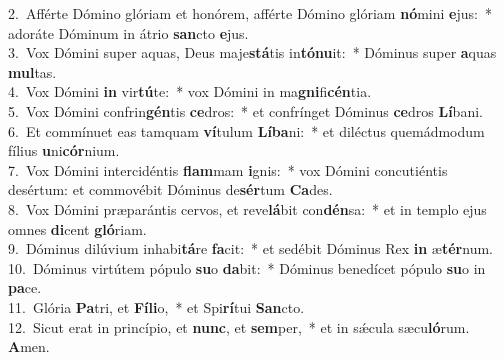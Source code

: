 {2.~}Afférte Dómino glóriam et honórem, afférte Dómino glóriam \textbf{nó}mini \textbf{e}jus:~* adoráte Dóminum in átrio \textbf{san}cto \textbf{e}jus.\\
{3.~}Vox Dómini super aquas, Deus maje\textbf{stá}tis in\textbf{tó}\textbf{nu}it:~* Dóminus super \textbf{a}quas \textbf{mul}tas.\\
{4.~}Vox Dómini \textbf{in} vir\textbf{tú}te:~* vox Dómini in ma\textbf{gni}fi\textbf{cén}tia.\\
{5.~}Vox Dómini confrin\textbf{gén}tis \textbf{ce}dros:~* et confrínget Dóminus \textbf{ce}dros \textbf{Lí}bani.\\
{6.~}Et commínuet eas tamquam \textbf{ví}tulum \textbf{Lí}\textbf{ba}ni:~* et diléctus quemádmodum fílius \textbf{u}ni\textbf{cór}nium.\\
{7.~}Vox Dómini intercidéntis \textbf{flam}mam \textbf{i}gnis:~* vox Dómini concutiéntis desértum: et commovébit Dóminus de\textbf{sér}tum \textbf{Ca}des.\\
{8.~}Vox Dómini præparántis cervos, et reve\textbf{lá}bit con\textbf{dén}sa:~* et in templo ejus omnes \textbf{di}cent \textbf{gló}riam.\\
{9.~}Dóminus dilúvium inhabi\textbf{tá}re \textbf{fa}cit:~* et sedébit Dóminus Rex \textbf{in} æ\textbf{tér}num.\\
{10.~}Dóminus virtútem pópulo \textbf{su}o \textbf{da}bit:~* Dóminus benedícet pópulo \textbf{su}o in \textbf{pa}ce.\\
{11.~}Glória \textbf{Pa}tri, et \textbf{Fí}\textbf{li}o,~* et Spi\textbf{rí}tui \textbf{San}cto.\\
{12.~}Sicut erat in princípio, et \textbf{nunc}, et \textbf{sem}per,~* et in sǽcula sæcu\textbf{ló}rum. \textbf{A}men.\\

